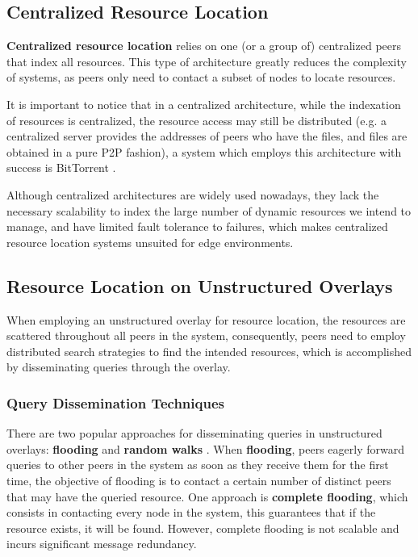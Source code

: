 \subsection{Centralized Resource Location}

\textbf{Centralized resource location} relies on one (or a group of) centralized peers that index all resources. This type of architecture greatly reduces the complexity of systems, as peers only need to contact a subset of nodes to locate resources. 

It is important to notice that in a centralized architecture, while the indexation of resources is centralized, the resource access may still be distributed (e.g. a centralized server provides the addresses of peers who have the files, and files are obtained in a pure P2P fashion), a system which employs this architecture with success is BitTorrent \cite{cohen2003incentives}.

Although centralized architectures are widely used nowadays, they lack the necessary scalability to index the large number of dynamic resources we intend to manage, and have limited fault tolerance to failures, which makes centralized resource location systems unsuited for edge environments. 


\subsection{Resource Location on Unstructured Overlays}

When employing an unstructured overlay for resource location, the resources are scattered throughout all peers in the system, consequently, peers need to employ distributed search strategies to find the intended resources, which is accomplished by disseminating queries through the overlay.

\subsubsection{Query Dissemination Techniques}

There are two popular approaches for disseminating queries in unstructured overlays: \textbf{flooding} and \textbf{random walks} \cite{leitaoPHDthesis}. When \textbf{flooding}, peers eagerly forward queries to other peers in the system as soon as they receive them for the first time, the objective of flooding is to contact a certain number of distinct peers that may have the queried resource. One approach is \textbf{complete flooding}, which consists in contacting every node in the system, this guarantees that if the resource exists, it will be found. However, complete flooding is not scalable and incurs significant message redundancy. 

